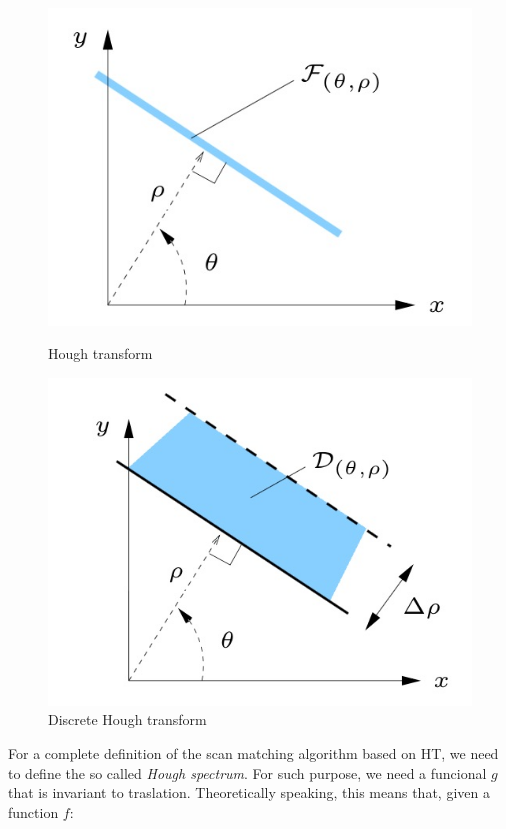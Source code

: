 \documentclass[a4paper, onecolumn]{report}
\begin{document}
\begin{figure}[htbp]
\centering
\begin{minipage}[c]{.40\textwidth}
\centering\setlength{\captionmargin}{0pt}%
\includegraphics[width=.90\textwidth]{images/ht.jpeg}
\caption{Hough transform}
\end{minipage}%
\hspace{10mm}%
\begin{minipage}[c]{.40\textwidth}
\centering\setlength{\captionmargin}{0pt}%
\includegraphics[width=.90\textwidth]{images/dht.jpeg}
\caption{Discrete Hough transform}
\end{minipage}
\end{figure}
For a complete definition of the scan matching algorithm based on HT, we need to define the so called \emph{Hough spectrum}. For such purpose, we need a funcional $g$ that is invariant to traslation. Theoretically speaking, this means that, given a function $f$:
\end{document}
